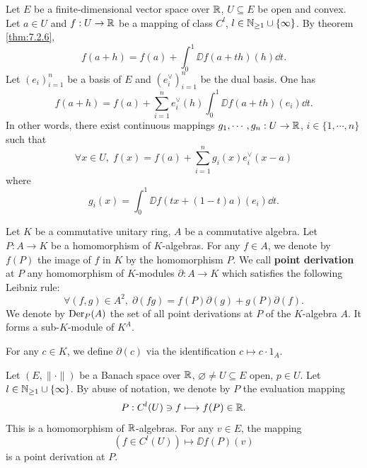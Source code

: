 \begin{remark}
    Let $E$ be a finite-dimensional vector space over $\mathbb{R}$,
    $U \subseteq E$ be open and convex.
    Let $a \in U$ and $f : U \rightarrow \mathbb{R}$ be a mapping of class $C^{l}$, $l \in \mathbb{N}_{\ge 1} \cup \{\infty\}$.
    By theorem \ref{thm:7.2.6},
    $$f(a + h) = f(a) + \int_{0}^{1} \DD f(a + th)(h) \dd t.$$
    Let $(e_i)_{i=1}^{n}$ be a basis of $E$ and $(e_i^\vee)_{i=1}^{n}$ be the dual basis.
    One has
    $$f(a + h) = f(a) + \sum_{i=1}^{n} e_i^\vee (h) \int_{0}^{1} \DD f(a + th)(e_i) \dd t.$$
    In other words, there exist continuous mappings $g_1,\cdots,g_n : U \rightarrow \mathbb{R}$, $i \in \{1,\cdots,n\}$ such that
    $$\forall x \in U,\; f(x) = f(a) + \sum_{i=1}^{n} g_i(x) e^\vee_i (x - a)$$
    where
    $$g_i(x) = \int_{0}^{1} \DD f(tx + (1-t)a)(e_i) \dd t.$$
\end{remark}

\begin{definitionenv}
    Let $K$ be a commutative unitary ring,
    $A$ be a commutative algebra.
    Let $P : A \rightarrow K$ be a homomorphism of $K$-algebras.
    For any $f \in A$, we denote by $f(P)$ the image of $f$ in $K$ by the homomorphism $P$.
    We call \textbf{point derivation} at $P$ any homomorphism of $K$-modules $\partial : A \rightarrow K$ which satisfies the following Leibniz rule:
    $$\forall (f,g) \in A^2,\; \partial(fg) = f(P) \partial(g) + g(P) \partial(f).$$
    We denote by $\operatorname{\mathrm{Der}}_P(A)$ the set of all point derivations at $P$ of the $K$-algebra $A$.
    It forms a sub-$K$-module of $K^A$.

    \quad For any $c \in K$, we define $\partial(c)$ via the identification $c \mapsto c\cdot 1_A$.
\end{definitionenv}

\begin{exampleenv}
    Let $(E,\|\cdot\|)$ be a Banach space over $\mathbb{R}$, $\varnothing \neq U \subseteq E$ open, $p \in U$.
    Let $l \in \mathbb{N}_{\ge 1} \cup \{\infty\}$.
    By abuse of notation, we denote by $P$ the evaluation mapping
    $$P : C^l(U) \ni f \longmapsto f(P) \in \mathbb{R}.$$
    This is a homomorphism of $\mathbb{R}$-algebras.
    For any $v \in E$, the mapping
    $$\left(f \in C^l(U)\right) \mapsto \DD f(P)(v)$$
    is a point derivation at $P$.
\end{exampleenv}


